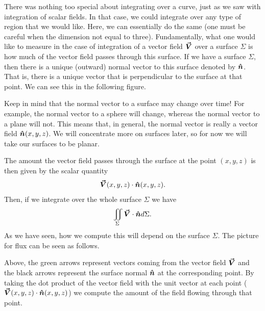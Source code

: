        	There was nothing too special about integrating over a curve, just as we saw with integration of scalar fields. In that case, we could integrate over any type of region that we would like.  Here, we can essentially do the same (one must be careful when the dimension not equal to three).  Fundamentally, what one would like to measure in the case of integration of a vector field $\boldsymbol{\vec{V}}$ over a surface $\Sigma$ is how much of the vector field passes through this surface.  If we have a surface $\Sigma$, then there is a unique (outward) normal vector to this surface denoted by $\boldsymbol{\hat{n}}$. That is, there is a unique vector that is perpendicular to the surface at that point. We can see this in the following figure.
       	
       	\begin{figure}[H]
       		\centering
       		\def\svgwidth{0.75\columnwidth}
       		
       	\end{figure}
       	
       	 Keep in mind that the normal vector to a surface may change over time!  For example, the normal vector to a sphere will change, whereas the normal vector to a plane will not. This means that, in general, the normal vector is really a vector field $\boldsymbol{\hat{n}}(x,y,z)$. We will concentrate more on surfaces later, so for now we will take our surfaces to be planar.
       	
       	The amount the vector field passes through the surface at the point $(x,y,z)$ is then given by the scalar quantity
       	\[
       	\boldsymbol{\vec{V}}(x,y,z) \cdot \boldsymbol{\hat{n}}(x,y,z).  
       	\]
       	Then, if we integrate over the whole surface $\Sigma$ we have
       	\[
       	\iint_\Sigma  \boldsymbol{\vec{V}} \cdot \boldsymbol{\hat{n}} d\Sigma.
       	\]
        As we have seen, how we compute this will depend on the surface $\Sigma$. The picture for flux can be seen as follows.
        
               	\begin{figure}[H]
               		\centering
               		\def\svgwidth{0.75\columnwidth}
               		
               	\end{figure}
               	
         Above, the green arrows represent vectors coming from the vector field $\boldsymbol{\vec{V}}$ and the black arrows represent the surface normal $\boldsymbol{\hat{n}}$ at the corresponding point. By taking the dot product of the vector field with the unit vector at each point ($\boldsymbol{\vec{V}}(x,y,z)\cdot \boldsymbol{\hat{n}}(x,y,z)$) we compute the amount of the field flowing through that point.
        
